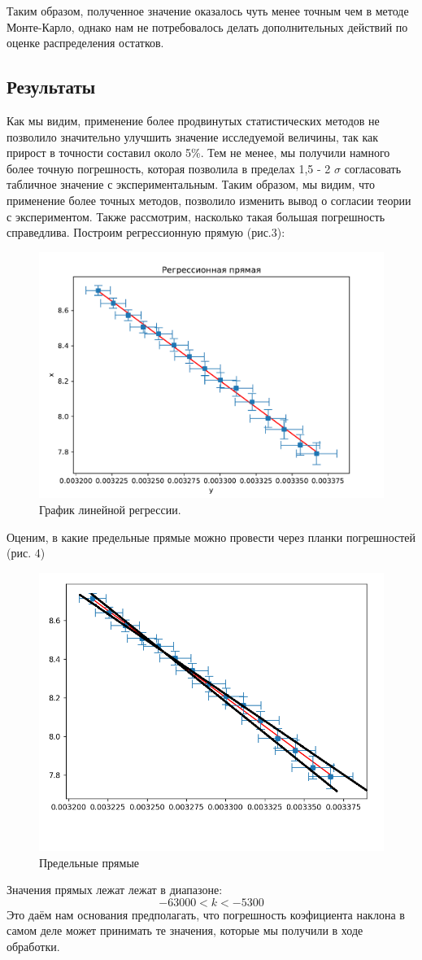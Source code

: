 \documentclass[a4paper,20pt]{article}
\theoremstyle{definition}
\begin{document}
 Таким образом, полученное значение оказалось чуть менее точным чем в методе Монте-Карло, однако
 нам не потребовалось делать дополнительных действий по оценке распределения остатков.

\subsection{Результаты}
Как мы видим, применение более продвинутых статистических методов не позволило значительно улучшить значение исследуемой величины, так как прирост в точности составил около 5\%.
Тем не менее, мы получили намного более точную погрешность, которая позволила в пределах 1,5 - 2 $\sigma$ согласовать табличное значение с экспериментальным. 
Таким образом, мы видим, что применение более точных методов, позволило изменить вывод о согласии теории с экспериментом.
Также рассмотрим, насколько такая большая погрешность справедлива. Построим регрессионную прямую (рис.3):
\begin{figure}[h!]
    \centering
    \includegraphics[width=0.7\linewidth]{linear_regression.pdf}
    \caption{График линейной регрессии.}    
\end{figure}
Оценим, в какие предельные прямые можно провести через планки погрешностей (рис. 4)
\begin{figure}[h!]
    \centering
    \includegraphics[width=0.7\linewidth]{differnet line.png}
    \caption{Предельные прямые}    
\end{figure}
Значения прямых лежат лежат в диапазоне:
\begin{equation}
	-63000 < k < - 5300
\end{equation}
Это даём нам основания предполагать, что погрешность коэфициента наклона в самом деле может принимать те значения, которые мы получили в ходе обработки.
\end{document}
